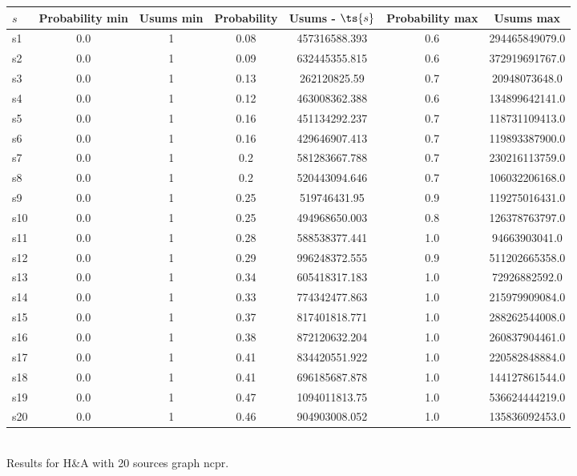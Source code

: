\documentclass{article}
\begin{document}
\noindent\begin{tabular}{|l|c|c|c|c|c|c|}
\hline
$s$& Probability min & Usums min & Probability & Usums - $\ts{s}$ & Probability max & Usums max\\
\hline
s1 &0.0 & 1 & 0.08 & 457316588.393 & 0.6 & 294465849079.0\\
\hline
s2 &0.0 & 1 & 0.09 & 632445355.815 & 0.6 & 372919691767.0\\
\hline
s3 &0.0 & 1 & 0.13 & 262120825.59 & 0.7 & 20948073648.0\\
\hline
s4 &0.0 & 1 & 0.12 & 463008362.388 & 0.6 & 134899642141.0\\
\hline
s5 &0.0 & 1 & 0.16 & 451134292.237 & 0.7 & 118731109413.0\\
\hline
s6 &0.0 & 1 & 0.16 & 429646907.413 & 0.7 & 119893387900.0\\
\hline
s7 &0.0 & 1 & 0.2 & 581283667.788 & 0.7 & 230216113759.0\\
\hline
s8 &0.0 & 1 & 0.2 & 520443094.646 & 0.7 & 106032206168.0\\
\hline
s9 &0.0 & 1 & 0.25 & 519746431.95 & 0.9 & 119275016431.0\\
\hline
s10 &0.0 & 1 & 0.25 & 494968650.003 & 0.8 & 126378763797.0\\
\hline
s11 &0.0 & 1 & 0.28 & 588538377.441 & 1.0 & 94663903041.0\\
\hline
s12 &0.0 & 1 & 0.29 & 996248372.555 & 0.9 & 511202665358.0\\
\hline
s13 &0.0 & 1 & 0.34 & 605418317.183 & 1.0 & 72926882592.0\\
\hline
s14 &0.0 & 1 & 0.33 & 774342477.863 & 1.0 & 215979909084.0\\
\hline
s15 &0.0 & 1 & 0.37 & 817401818.771 & 1.0 & 288262544008.0\\
\hline
s16 &0.0 & 1 & 0.38 & 872120632.204 & 1.0 & 260837904461.0\\
\hline
s17 &0.0 & 1 & 0.41 & 834420551.922 & 1.0 & 220582848884.0\\
\hline
s18 &0.0 & 1 & 0.41 & 696185687.878 & 1.0 & 144127861544.0\\
\hline
s19 &0.0 & 1 & 0.47 & 1094011813.75 & 1.0 & 536624444219.0\\
\hline
s20 &0.0 & 1 & 0.46 & 904903008.052 & 1.0 & 135836092453.0\\
\hline
\end{tabular}\\

\noindent Results for H\&A with 20 sources graph ncpr.
\end{document}
